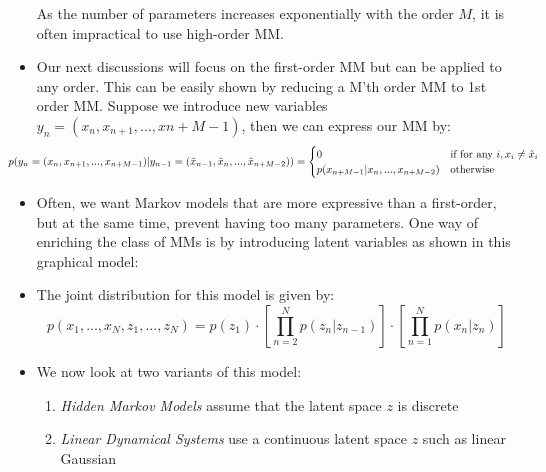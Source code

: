 \begin{itemize}
	As the number of parameters increases exponentially with the order $M$, it is often impractical to use high-order MM. 
	\item Our next discussions will focus on the first-order MM but can be applied to any order. This can be easily shown by reducing a M'th order MM to 1st order MM. Suppose we
	introduce new variables $y_n=(x_n,x_{n+1},...,x{n+M-1})$, then we can express our MM by:
	$$\hspace{-10mm}p(y_n=(x_n,x_{n+1},...,x_{n+M-1})|y_{n-1}=(\tilde{x}_{n-1},\tilde{x}_n,...,\tilde{x}_{n+M-2}))=\begin{cases}
	0 & \text{if for any } i, x_i\neq \tilde{x}_i\\
	p(x_{n+M-1}|x_n,...,x_{n+M-2}) & \text{otherwise}
	\end{cases}$$
	\item Often, we want Markov models that are more expressive than a first-order, but at the same time, prevent having too many parameters. One way of enriching the class of MMs is by introducing latent variables as shown in this graphical model:
	
	\begin{figure}[ht!]
		\centering
	\end{figure}
	\item The joint distribution for this model is given by: $$p(x_1,...,x_N,z_1,...,z_N)=p(z_1)\cdot \left[\prod_{n=2}^{N} p(z_n|z_{n-1})\right]\cdot \left[\prod_{n=1}^{N} p(x_n|z_{n})\right]$$
	\item We now look at two variants of this model:
	\begin{enumerate}
		\item \textit{Hidden Markov Models} assume that the latent space $z$ is discrete
		\item \textit{Linear Dynamical Systems} use a continuous latent space $z$ such as linear Gaussian
	\end{enumerate}
\end{itemize}

